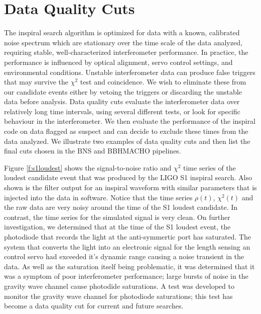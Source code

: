 \section{Data Quality Cuts}
\label{s:dq}

The inspiral search algorithm is optimized for data with a known, calibrated
noise spectrum which are stationary over the time scale of the data analyzed,
requiring stable, well-characterized interferometer performance.  In practice,
the performance is influenced by optical alignment, servo control settings,
and environmental conditions. Unstable interferometer data can produce false
triggers that may survive the $\chi^2$ test and coincidence. We wish to
eliminate these from our candidate events either by vetoing the triggers or
discarding the unstable data before analysis. Data quality cuts evaluate the
interferometer data over relatively long time intervals, using several
different tests, or look for specific behaviour in the interferometer.
We then evaluate the performance of the inspiral code on data flagged as
suspect and can decide to exclude these times from the data analyzed. We
illustrate two examples of data quality cuts and then list the final cuts
chosen in the BNS and BBHMACHO pipelines.

Figure \ref{f:s1loudest} shows the signal-to-noise ratio and $\chi^2$ time
series of the loudest candidate event that was produced by the LIGO S1
inspiral search. Also shown is the filter output for an inspiral waveform with
similar parameters that is injected into the data in software. Notice that the
time series $\rho(t)$, $\chi^2(t)$ and the raw data are very noisy around the
time of the S1 loudest candidate. In contrast, the time series for the
simulated signal is very clean. On further investigation, we determined that
at the time of the S1 loudest event, the photodiode that records the light at
the anti-symmertic port has saturated. The system that converts the light into
an electronic signal for the length sensing an control servo had exceeded it's
dynamic range causing a noise transient in the data. As well as the saturation
itself being problematic, it was determined that it was a symptom of poor
interferometer performance; large bursts of noise in the gravity wave channel
cause photodide saturations. A test was developed to monitor the gravity wave
channel for photodiode saturations; this test has become a data quality cut
for current and future searches.


